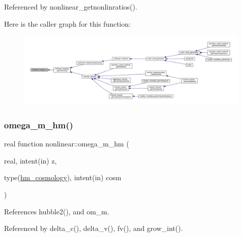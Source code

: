 Referenced by nonlinear\+\_\+getnonlinratios().

Here is the caller graph for this function\+:
\nopagebreak
\begin{figure}[H]
\begin{center}
\leavevmode
\includegraphics[width=350pt]{namespacenonlinear_a114a4d8047f3679297cc7b1c216d6517_icgraph}
\end{center}
\end{figure}
\mbox{\label{namespacenonlinear_ac515b61587eefa54d1ebc904d0ef78b6}} 
\subsubsection{\texorpdfstring{omega\+\_\+m\+\_\+hm()}{omega\_m\_hm()}}
{\footnotesize\ttfamily real function nonlinear\+::omega\+\_\+m\+\_\+hm (\begin{DoxyParamCaption}\item[{real, intent(in)}]{z,  }\item[{type(\mbox{\hyperlink{structnonlinear_1_1hm__cosmology}{hm\+\_\+cosmology}}), intent(in)}]{cosm }\end{DoxyParamCaption})\hspace{0.3cm}{\ttfamily [private]}}



References hubble2(), and om\+\_\+m.



Referenced by delta\+\_\+c(), delta\+\_\+v(), fv(), and grow\+\_\+int().

